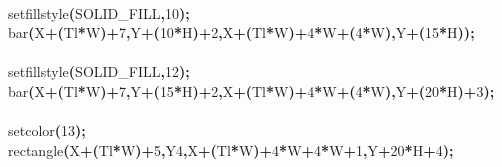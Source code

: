 \documentclass[a4paper, 10pt]{article}
\newcommand\SPC{\hspace*{0.6em}}
\newcommand\HYP{\mbox{\char 45}}
\newcommand{\CppAIdentifier}[1]{#1}
\newcommand{\CppANumber}[1]{\textcolor[rgb]{0.5,0,0.5}{#1}}
\newcommand{\CppASpace}[1]{\colorbox[rgb]{1,1,1}{#1}}
\newcommand{\CppASymbol}[1]{\textbf{\textcolor[rgb]{1,0,0}{#1}}}
\begin{document}
\begin{ttfamily}
\\
\CppASpace{\SPC \SPC \SPC \SPC \SPC \SPC \SPC }\CppAIdentifier{setfillstyle}\CppASymbol{(}\CppAIdentifier{SOLID\_FILL}\CppASymbol{,}\CppANumber{10}\CppASymbol{)}\CppASymbol{;}\\
\CppASpace{\SPC \SPC \SPC \SPC \SPC \SPC \SPC }\CppAIdentifier{bar}\CppASymbol{(}\CppAIdentifier{X}\CppASymbol{+}\CppASymbol{(}\CppAIdentifier{Tl}\CppASymbol{*}\CppAIdentifier{W}\CppASymbol{)}\CppASymbol{+}\CppANumber{7}\CppASymbol{,}\CppAIdentifier{Y}\CppASymbol{+}\CppASymbol{(}\CppANumber{10}\CppASymbol{*}\CppAIdentifier{H}\CppASymbol{)}\CppASymbol{+}\CppANumber{2}\CppASymbol{,}\CppAIdentifier{X}\CppASymbol{+}\CppASymbol{(}\CppAIdentifier{Tl}\CppASymbol{*}\CppAIdentifier{W}\CppASymbol{)}\CppASymbol{+}\CppANumber{4}\CppASymbol{*}\CppAIdentifier{W}\CppASymbol{+}\CppASymbol{(}\CppANumber{4}\CppASymbol{*}\CppAIdentifier{W}\CppASymbol{)}\CppASymbol{,}\CppAIdentifier{Y}\CppASymbol{+}\CppASymbol{(}\CppANumber{15}\CppASymbol{*}\CppAIdentifier{H}\CppASymbol{)}\CppASymbol{)}\CppASymbol{;}\\
\\
\CppASpace{\SPC \SPC \SPC \SPC \SPC \SPC \SPC }\CppAIdentifier{setfillstyle}\CppASymbol{(}\CppAIdentifier{SOLID\_FILL}\CppASymbol{,}\CppANumber{12}\CppASymbol{)}\CppASymbol{;}\\
\CppASpace{\SPC \SPC \SPC \SPC \SPC \SPC \SPC }\CppAIdentifier{bar}\CppASymbol{(}\CppAIdentifier{X}\CppASymbol{+}\CppASymbol{(}\CppAIdentifier{Tl}\CppASymbol{*}\CppAIdentifier{W}\CppASymbol{)}\CppASymbol{+}\CppANumber{7}\CppASymbol{,}\CppAIdentifier{Y}\CppASymbol{+}\CppASymbol{(}\CppANumber{15}\CppASymbol{*}\CppAIdentifier{H}\CppASymbol{)}\CppASymbol{+}\CppANumber{2}\CppASymbol{,}\CppAIdentifier{X}\CppASymbol{+}\CppASymbol{(}\CppAIdentifier{Tl}\CppASymbol{*}\CppAIdentifier{W}\CppASymbol{)}\CppASymbol{+}\CppANumber{4}\CppASymbol{*}\CppAIdentifier{W}\CppASymbol{+}\CppASymbol{(}\CppANumber{4}\CppASymbol{*}\CppAIdentifier{W}\CppASymbol{)}\CppASymbol{,}\CppAIdentifier{Y}\CppASymbol{+}\CppASymbol{(}\CppANumber{20}\CppASymbol{*}\CppAIdentifier{H}\CppASymbol{)}\CppASymbol{+}\CppANumber{3}\CppASymbol{)}\CppASymbol{;}\\
\\
\CppASpace{\SPC \SPC \SPC \SPC \SPC \SPC \SPC }\CppAIdentifier{setcolor}\CppASymbol{(}\CppANumber{13}\CppASymbol{)}\CppASymbol{;}\\
\CppASpace{\SPC \SPC \SPC \SPC \SPC \SPC \SPC }\CppAIdentifier{rectangle}\CppASymbol{(}\CppAIdentifier{X}\CppASymbol{+}\CppASymbol{(}\CppAIdentifier{Tl}\CppASymbol{*}\CppAIdentifier{W}\CppASymbol{)}\CppASymbol{+}\CppANumber{5}\CppASymbol{,}\CppAIdentifier{Y}\CppASymbol{\HYP }\CppANumber{4}\CppASymbol{,}\CppAIdentifier{X}\CppASymbol{+}\CppASymbol{(}\CppAIdentifier{Tl}\CppASymbol{*}\CppAIdentifier{W}\CppASymbol{)}\CppASymbol{+}\CppANumber{4}\CppASymbol{*}\CppAIdentifier{W}\CppASymbol{+}\CppANumber{4}\CppASymbol{*}\CppAIdentifier{W}\CppASymbol{+}\CppANumber{1}\CppASymbol{,}\CppAIdentifier{Y}\CppASymbol{+}\CppANumber{20}\CppASymbol{*}\CppAIdentifier{H}\CppASymbol{+}\CppANumber{4}\CppASymbol{)}\CppASymbol{;}\\

\end{ttfamily}
\end{document}

